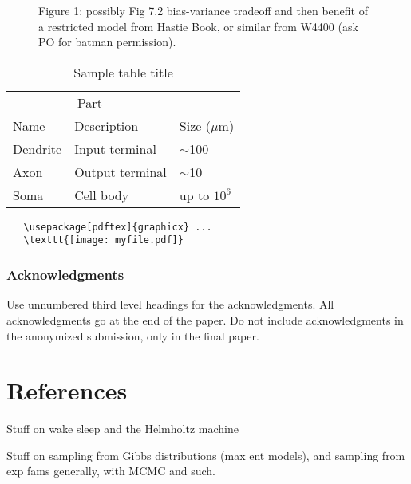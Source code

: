 \documentclass{article}
\begin{document}
\begin{figure}
  \centering
  \fbox{\rule[-.5cm]{0cm}{4cm} \rule[-.5cm]{4cm}{0cm}}
  \caption{Figure 1: possibly Fig 7.2 bias-variance tradeoff and then benefit of a restricted model from Hastie Book, or similar from W4400 (ask PO for batman permission).}
\end{figure}



\begin{table}
  \caption{Sample table title}
  \label{sample-table}
  \centering
  \begin{tabular}{lll}
    \toprule
    \multicolumn{2}{c}{Part}                   \\
    \cmidrule(r){1-2}
    Name     & Description     & Size ($\mu$m) \\
    \midrule
    Dendrite & Input terminal  & $\sim$100     \\
    Axon     & Output terminal & $\sim$10      \\
    Soma     & Cell body       & up to $10^6$  \\
    \bottomrule
  \end{tabular}
\end{table}


\begin{verbatim}
   \usepackage[pdftex]{graphicx} ...
   \texttt{[image: myfile.pdf]}
\end{verbatim}




\clearpage

\subsubsection*{Acknowledgments}

Use unnumbered third level headings for the acknowledgments. All
acknowledgments go at the end of the paper. Do not include
acknowledgments in the anonymized submission, only in the final paper.

\section*{References}




Stuff on wake sleep and the Helmholtz machine

Stuff on sampling from Gibbs distributions (max ent models), and sampling from exp fams generally, with MCMC and such.
\end{document}
